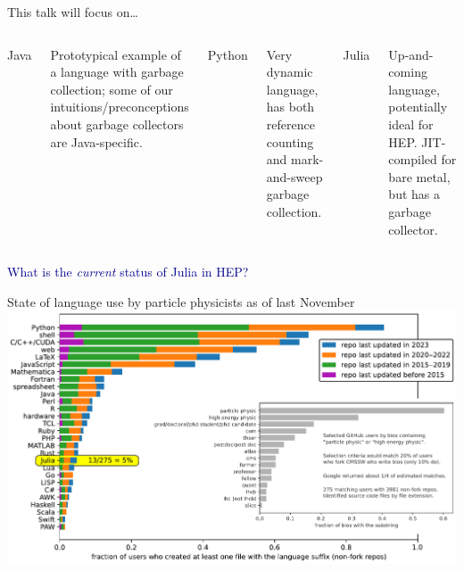 \documentclass[aspectratio=169]{beamer}
\begin{document}
\begin{frame}{This talk will focus on\ldots}
\begin{columns}[t]


\Huge
Java

\vspace{0.5 cm}
\large
Prototypical example of a language with garbage collection; some of our intuitions/preconceptions about garbage collectors are Java-specific.


\Huge
Python

\vspace{0.5 cm}
\large
Very dynamic language, has both reference counting and mark-and-sweep garbage collection.


\Huge
Julia

\vspace{0.5 cm}
\large
Up-and-coming language, potentially ideal for HEP. JIT-compiled for bare metal, but has a garbage collector.

\end{columns}
\end{frame}

\begin{frame}{}
\LARGE
\begin{center}
\textcolor{darkblue}{What is the {\it current} status of Julia in HEP?}
\end{center}
\end{frame}

\begin{frame}{State of language use by particle physicists as of last November}
\vspace{0.2 cm}
\includegraphics[width=\linewidth]{physicist-languages-presentation.pdf}
\end{frame}
\end{document}
